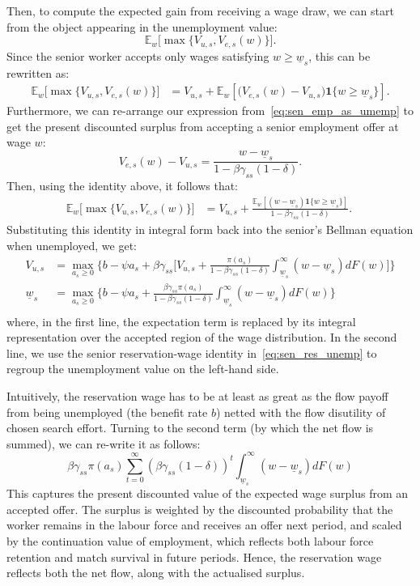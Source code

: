 \documentclass{article}
\newcommand{\lbar}[1]{\underline{#1}} %
\begin{document}
Then, to compute the expected gain from receiving a wage draw, we can start from the object appearing in the unemployment value:
\[
\mathbb{E}_w\bigl[\max\{V_{u,s},V_{e,s}(w)\}\bigr].
\]
Since the senior worker accepts only wages satisfying $w\geq \lbar{w}_s$, this can be rewritten as:
\begin{align*}
\mathbb{E}_w\bigl[\max\{V_{u,s},V_{e,s}(w)\}\bigr]
&=
V_{u,s}
+
\mathbb{E}_w\!\left[
\bigl(V_{e,s}(w)-V_{u,s}\bigr)
\mathbf{1}\{w\geq \lbar{w}_s\}
\right].
\end{align*}
Furthermore, we can re-arrange our expression from~\eqref{eq:sen_emp_as_umemp} to get the present discounted surplus from accepting a senior employment offer at wage $w$:
\[
V_{e,s}(w)-V_{u,s}
=
\frac{w-\lbar{w}_s}{1-\beta\gamma_{ss}(1-\delta)}.
\]
Then, using the identity above, it follows that:
\begin{align}
\mathbb{E}_w\bigl[\max\{V_{u,s},V_{e,s}(w)\}\bigr]
&=
V_{u,s}
+
\frac{
\mathbb{E}_w\!\left[
(w-\lbar{w}_s)\mathbf{1}\{w\geq \lbar{w}_s\}
\right]
}{
1-\beta\gamma_{ss}(1-\delta)
}.
~\label{eq:expected_max_senior}
\end{align}
Substituting this identity in integral form back into the senior's Bellman equation when unemployed, we get:
\begin{align*}
V_{u,s}&=\max_{a_s\geq 0}\Biggl\{b-\psi a_s+\beta\gamma_{ss}\biggl[V_{u,s}+\frac{\pi(a_s)}{1-\beta\gamma_{ss}(1-\delta)}\int_{\lbar{w}_s}^\infty(w-\lbar{w}_s)dF(w)\biggr]\Biggr\}\\
\lbar{w}_s&=\max_{a_s\geq 0}\Biggl\{b-\psi a_s+\frac{\beta\gamma_{ss}\pi(a_s)}{1-\beta\gamma_{ss}(1-\delta)}\int_{\lbar{w}_s}^\infty(w-\lbar{w}_s)dF(w)\Biggr\}\\
\end{align*}
where, in the first line, the expectation term is replaced by its integral representation over the accepted region of the wage distribution. In the second line, we use the senior reservation-wage identity in~\eqref{eq:sen_res_unemp} to regroup the unemployment value on the left-hand side. 

Intuitively, the reservation wage has to be at least as great as the flow payoff from being unemployed (the benefit rate $b$) netted with the flow disutility of chosen search effort. Turning to the second term (by which the net flow is summed), we can re-write it as follows:
\[
\beta\gamma_{ss}\pi(a_s)\sum_{t=0}^\infty(\beta\gamma_{ss}(1-\delta))^t\int_{\lbar{w}_s}^\infty(w-\lbar{w}_s)dF(w)
\]
This captures the present discounted value of the expected wage surplus from an accepted offer. The surplus is weighted by the discounted probability that the worker remains in the labour force and receives an offer next period, and scaled by the continuation value of employment, which reflects both labour force retention and match survival in future periods. Hence, the reservation wage reflects both the net flow, along with the actualised surplus.
\end{document}
